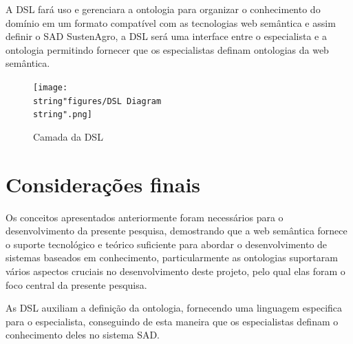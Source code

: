 A DSL fará uso e gerenciara a ontologia para organizar o conhecimento
do domínio em um formato compatível com as tecnologias web semântica
e assim definir o SAD SustenAgro, a DSL será uma interface entre o
especialista e a ontologia permitindo fornecer que os especialistas
definam ontologias da web semântica.

\begin{figure}
\begin{centering}
\texttt{[image: \\string"figures/DSL Diagram\\string".png]}
\par\end{centering}
\caption{Camada da DSL \label{fig:Camada-da-DSL}}
\end{figure}


\section{Considerações finais}

Os conceitos apresentados anteriormente foram necessários para o desenvolvimento
da presente pesquisa, demostrando que a web semântica fornece o suporte
tecnológico e teórico suficiente para abordar o desenvolvimento de
sistemas baseados em conhecimento, particularmente as ontologias suportaram
vários aspectos cruciais no desenvolvimento deste projeto, pelo qual
elas foram o foco central da presente pesquisa. 

As DSL auxiliam a definição da ontologia, fornecendo uma linguagem
especifica para o especialista, conseguindo de esta maneira que os
especialistas definam o conhecimento deles no sistema SAD.
